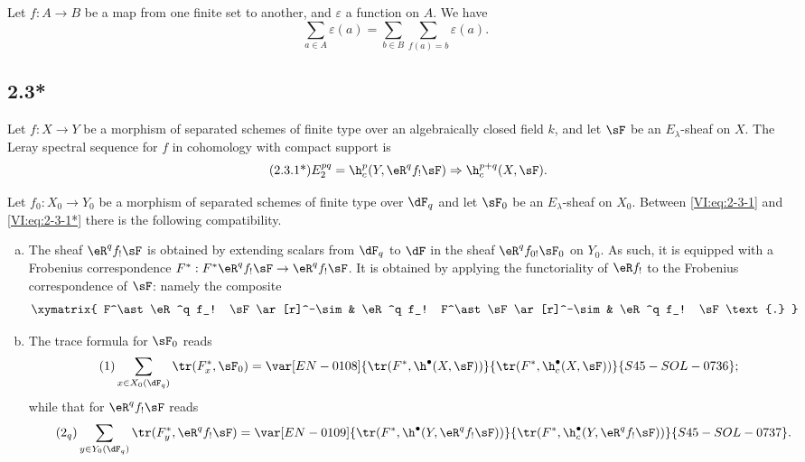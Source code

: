 Let $f:A\to B$ be a map from one finite set to another, and 
$\varepsilon$ a function on $A$. We have 
\begin{equation*}\tag{2.3.1}\label{VI:eq:2-3-1}
  \sum_{a\in A} \varepsilon(a) = \sum_{b\in B} \sum_{f(a)=b} \varepsilon(a) \text{.}
\end{equation*}






\subsection*{2.3*}\label{VI:2-3*}

Let $f:X\to Y$ be a morphism of separated schemes of finite type over an 
algebraically closed field $k$, and let $\sF$ be an $E_\lambda$-sheaf on $X$. The 
Leray spectral sequence for $f$ in cohomology with compact support is 
\begin{align*}\tag{2.3.1*}\label{VI:eq:2-3-1*}
  E_2^{p q} = \h_c^p(Y,\eR^q f_! \sF) \Rightarrow \h_c^{p+q}(X,\sF) \text{.}
\end{align*}

Let $f_0:X_0 \to Y_0$ be a morphism of separated schemes of finite type over 
$\dF_q$ and let $\sF_0$ be an $E_\lambda$-sheaf on $X_0$. Between 
\eqref{VI:eq:2-3-1} and \eqref{VI:eq:2-3-1*} there is the following compatibility. 

\begin{enumerate}[a)]
  \item The sheaf $\eR^q f_! \sF$ is obtained by extending scalars from 
    $\dF_q$ to $\dF$ in the sheaf $\eR^q f_{0!} \sF_0$ on $Y_0$. As 
    such, it is equipped with a Frobenius correspondence 
    $F^\ast:F^\ast\eR^q f_! \sF \to \eR^q f_! \sF$. It is obtained by applying 
    the functoriality of $\eR f_!$ to the Frobenius correspondence of $\sF$: 
    namely the composite 
    \[\xymatrix{
      F^\ast \eR^q f_! \sF \ar[r]^-\sim 
        & \eR^q f_! F^\ast \sF \ar[r]^-\sim 
        & \eR^q f_! \sF \text{.}
    }\]
  \item The trace formula for $\sF_0$ reads 
    \begin{align*}\tag{1}\label{VI:eq:1}
      \sum_{x\in X_0(\dF_q)} \tr(F_x^\ast,\sF_0) = \var[EN-0108]{\tr(F^\ast,\h^\bullet(X,\sF))}{\tr(F^\ast,\h_c^\bullet(X,\sF))}{S45-SOL-0736} \text{;}
    \end{align*}
    while that for $\eR^q f_! \sF$ reads 
    \begin{align*}\tag{2$_q$}\label{VI:eq:2_q} 
      \sum_{y\in Y_0(\dF_q)} \tr(F_y^\ast,\eR^q f_! \sF) = \var[EN-0109]{\tr(F^\ast, \h^\bullet(Y,\eR^q f_! \sF))}{\tr(F^\ast,\h_c^\bullet(Y,\eR^q f_! \sF))}{S45-SOL-0737} \text{.}
    \end{align*}
\end{enumerate}

